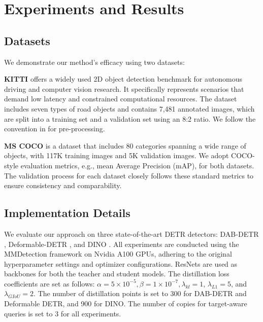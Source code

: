 \section{Experiments and Results}




\subsection{Datasets}
We demonstrate our method's efficacy using two datasets:

\noindent\textbf{KITTI} \cite{Geiger2012CVPR} offers a widely used 2D object detection benchmark for autonomous driving and computer vision research. It specifically represents scenarios that demand low latency and constrained computational resources. The dataset includes seven types of road objects and contains 7,481 annotated images, which are split into a training set and a validation set using an 8:2 ratio. We follow the convention in \cite{lan2024gradient} for pre-processing.

\noindent\textbf{MS COCO} is a dataset that includes 80 categories spanning a wide range of objects, with 117K training images and 5K validation images.
We adopt COCO-style evaluation metrics, e.g., mean Average Precision (mAP), for both datasets. 
The validation process for each dataset closely follows these standard metrics to ensure consistency and comparability.

\subsection{Implementation Details}
We evaluate our approach on three state-of-the-art DETR detectors: DAB-DETR \cite{liu2022dab}, Deformable-DETR \cite{zhu2020deformable}, and DINO \cite{zhang2023dino}. All experiments are conducted using the MMDetection framework \cite{mmdetection} on Nvidia A100 GPUs, adhering to the original hyperparameter settings and optimizer configurations. ResNets \cite{he2016deep} are used as backbones for both the teacher and student models. The distillation loss coefficients are set as follows: $\alpha = 5\times 10^{-5}, \beta = 1\times 10^{-7}, \lambda_{kl} = 1$, $\lambda_{L1} = 5$, and $\lambda_{GIoU} = 2$. The number of distillation points is set to 300 for DAB-DETR and Deformable DETR, and 900 for DINO. The number of copies for target-aware queries is set to 3 for all experiments. 


